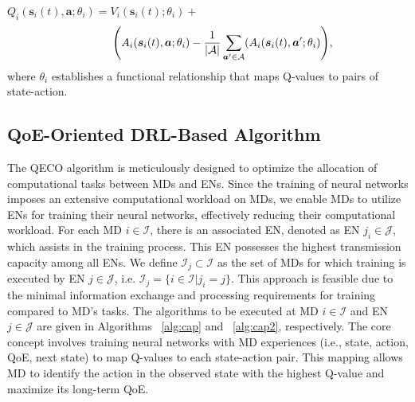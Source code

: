 \documentclass[12pt,draftclsnofoot,onecolumn]{IEEEtran}
\begin{document}
$Q_i(\boldsymbol{s}_i(t), \boldsymbol{a}; \theta_i) = V_i(\boldsymbol{s}_i(t);\theta_i) +$
\begin{alignat}{1}
	\hspace{0.94cm} \Bigg( A_i(\boldsymbol{s}_i(t),\boldsymbol{a};\theta_i) - {1 \over |\mathcal{A}|} \sum\limits_{\boldsymbol{a}' \in \mathcal{A}}(A_i(\boldsymbol{s}_i(t),\boldsymbol{a}';\theta_i) \Bigg),
	\label{25}  
\end{alignat}
where $\theta_i$ establishes a functional relationship that maps Q-values to pairs of state-action.





\subsection{QoE-Oriented DRL-Based Algorithm}
\label{section:1}


The QECO algorithm is meticulously designed to optimize the allocation of computational tasks between MDs and ENs. Since the training of neural networks imposes an extensive computational workload on MDs, we enable MDs to utilize ENs for training their neural networks, effectively reducing their computational workload. For each MD $i \in \mathcal{I}$, there is an associated EN, denoted as EN $j_i \in \mathcal{J}$, which assists in the training process. This EN possesses the highest transmission capacity among all ENs. We define $\mathcal{I}_j \subset \mathcal{I}$ as the set of MDs for which training is executed by EN $j \in \mathcal{J}$, i.e. $\mathcal{I}_j = \{i \in \mathcal{I} | j_i = j\}$. This approach is feasible due to the minimal information exchange and processing requirements for training compared to MD's tasks. The algorithms to be executed at MD $i \in \mathcal{I}$ and EN $j \in \mathcal{J}$ are given in Algorithms ~\ref{alg:cap} and ~\ref{alg:cap2}, respectively. The core concept involves training neural networks with MD experiences (i.e., state, action, QoE, next state) to map Q-values to each state-action pair. This mapping allows MD to identify the action in the observed state with the highest Q-value and maximize its long-term QoE.
\end{document}

